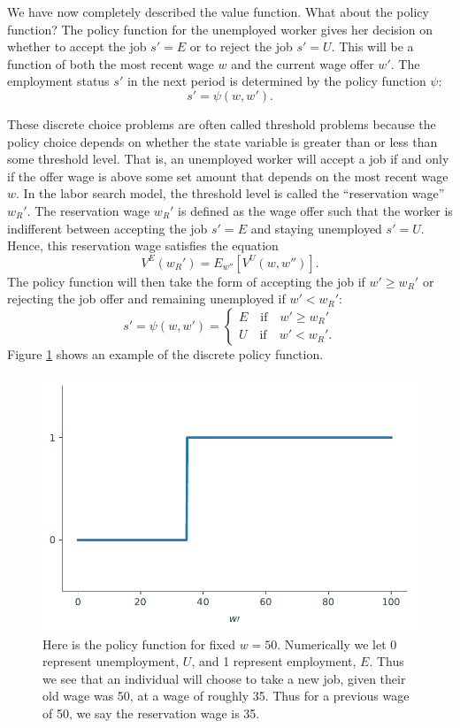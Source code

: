 We have now completely described the value function. What about the policy function?
The policy function for the unemployed worker gives her decision on whether to accept the job $s'=E$
or to reject the job $s'= U$.
This will be a function of both the most recent wage $w$ and the current wage offer $w'$.
The employment status $s'$ in the next period is determined by the policy function $\psi$:
\[
s' = \psi(w,w').
\]

These discrete choice problems are often called threshold
problems because the policy choice depends on whether the state variable is greater than or less than
some threshold level. That is, an unemployed worker will accept a job if and only if the offer wage is
above some set amount that depends on the most recent wage $w$. In the labor search model,
the threshold level is called the ``reservation wage'' $w_R'$. The reservation wage $w_R'$ is defined as
the wage offer such that the worker is indifferent between accepting the job $s' = E$ and
staying unemployed $s' = U$. Hence, this reservation wage satisfies the equation
\begin{equation}\label{EqWR}
   V^E(w_R') = E_{w''}\left[V^U(w,w'')\right].
\end{equation}
The policy function will then take the form of accepting the job if $w' \geq w_R'$ or
rejecting the job offer and remaining unemployed if $w' < w_R'$:
\begin{equation}\label{EqSprime}
   s' = \psi(w,w') = \begin{cases}
                      E \quad\text{if}\quad w' \geq w_R' \\
                      U \quad\text{if}\quad w' < w_R'.
                   \end{cases}
\end{equation}
Figure \ref{fig:disc_policy} shows an example of the discrete policy function.

\begin{figure}
\includegraphics[width=\textwidth]{figures/disc_policy.pdf}
\caption{Here is the policy function for fixed $w = 50$.  Numerically we let 0 represent unemployment, $U$,
and 1 represent employment, $E$.  Thus we see that an individual will choose to take a new job, given
their old wage was 50, at a wage of roughly 35.  Thus for a previous wage of 50, we say the reservation wage is 35.}
\label{fig:disc_policy}
\end{figure}

